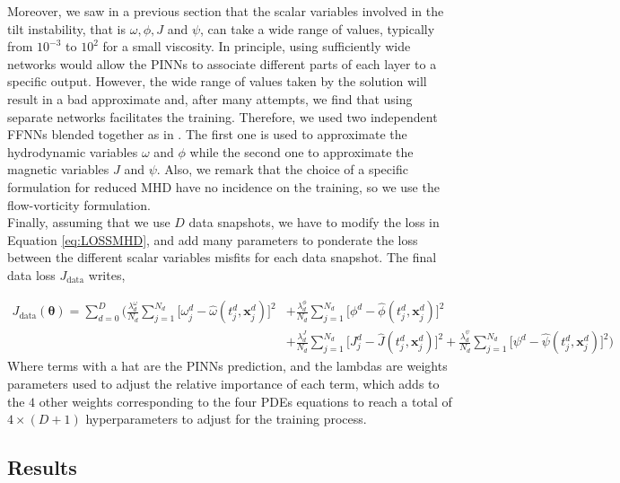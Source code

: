 \documentclass[12pt,openany]{amsbook}
\newcommand{\bbm}[1]{{\mathbf{#1}}}
\begin{document}
Moreover, we saw in a previous section that the scalar variables involved in the tilt instability, that is $\omega,\phi,J$ and $\psi$,
can take a wide range of values, typically from $10^{-3}$ to $10^2$ for a small viscosity.  In principle, using 
sufficiently wide networks would allow the PINNs to associate different parts of each layer to a specific
output. However, the wide range of values taken by the solution will result in a bad approximate and, after many attempts, 
we find that using separate networks facilitates the training.
Therefore, we used two independent FFNNs blended together as in \cite{HAGHIGHAT2021113741}.
The first one is used to approximate the hydrodynamic variables $\omega$ and $\phi$ while the second
one to approximate the magnetic variables $J$ and $\psi$. Also, we remark that the choice of a specific formulation for 
reduced MHD have no incidence on the training, so we use the flow-vorticity formulation.\\

Finally, assuming that we use $D$ data snapshots, we have to modify the loss in Equation \ref{eq:LOSSMHD}, and add many parameters to 
ponderate the loss between the different scalar variables misfits for each data snapshot. The final data loss $J_{\text{data}}$
writes,

\begin{align}
    J_{\text{data}}(\bm \theta)  
     = \sum_{d=0}^{D} \Big( \frac{\lambda_d^\omega}{N_d} \sum_{j=1}^{N_d} \big[ \omega_j^d  - \hat{\omega}(t_j^d, \bbm x_j^d) \big]^2 
    & + \frac{\lambda_d^\phi}{N_d} \sum_{j=1}^{N_d} \big[ \phi^d  - \hat{\phi}(t_j^d, \bbm x_j^d) \big]^2 \\
    & + \frac{\lambda_d^J}{N_d} \sum_{j=1}^{N_d} \big[ J_j^d  - \hat{J}(t_j^d, \bbm x_j^d) \big]^2 
    + \frac{\lambda_d^\psi}{N_d} \sum_{j=1}^{N_d} \big[ \psi^d  - \hat{\psi}(t_j^d, \bbm x_j^d) \big]^2 \Big)
    \label{eq:LOSSMHD2}
\end{align}
Where terms with a hat are the PINNs prediction, and the lambdas
are weights parameters used to adjust the relative importance of each term, which adds to the $4$ other weights 
corresponding to the four PDEs equations to reach a total of $4\times (D+1)$ hyperparameters to adjust 
for the training process.

\subsection{Results}
\end{document}

